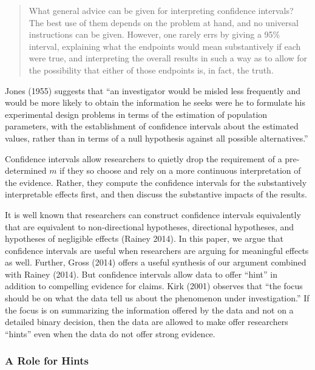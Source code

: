 \documentclass[12pt]{article}
\begin{document}
\begin{quote}
What general advice can be given for interpreting confidence intervals? The best use of them depends on the problem at hand, and no universal instructions can be given. However, one rarely errs by giving a 95\% interval, explaining what the endpoints would mean substantively if each were true, and interpreting the overall results in such a way as to allow for the possibility that either of those endpoints is, in fact, the truth.
\end{quote}

Jones (1955) suggests that ``an investigator would be misled less frequently and would be more likely to obtain the information he seeks were he to formulate his experimental design problems in terms of the estimation of population parameters, with the establishment of confidence intervals about the estimated values, rather than in terms of a null hypothesis against all possible alternatives.''

Confidence intervals allow researchers to quietly drop the requirement of a pre-determined $m$ if they so choose and rely on a more continuous interpretation of the evidence. Rather, they compute the confidence intervals for the substantively interpretable effects first, and then discuss the substantive impacts of the results.

It is well known that researchers can construct confidence intervals equivalently that are equivalent to non-directional hypotheses, directional hypotheses, and hypotheses of negligible effects (Rainey 2014). In this paper, we argue that confidence intervals are useful when researchers are arguing for meaningful effects as well. Further, Gross (2014) offers a useful synthesis of our argument combined with Rainey (2014). But confidence intervals allow data to offer ``hint'' in addition to compelling evidence for claims. Kirk (2001) observes that ``the focus should be on what the data tell us about the phenomenon under investigation.'' If the focus is on summarizing the information offered by the data and not on a detailed binary decision, then the data are allowed to make offer researchers ``hints'' even when the data do not offer strong evidence.

\subsubsection*{A Role for Hints}
\end{document}
